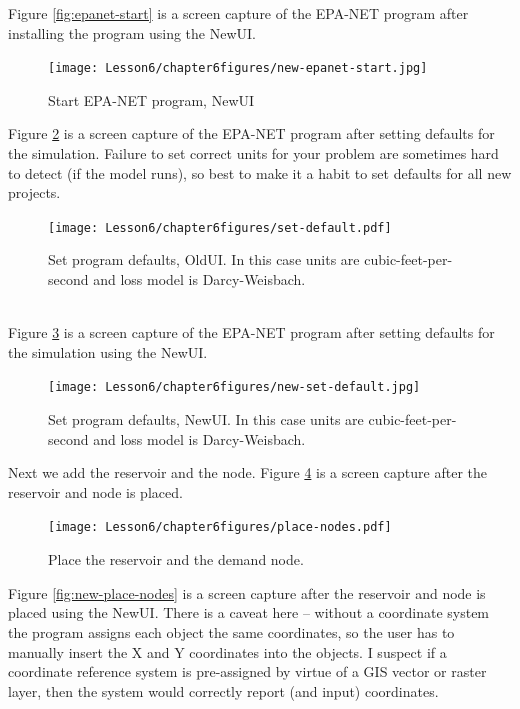 Figure \ref{fig:epanet-start} is a screen capture of the EPA-NET program after installing the program using the NewUI. 
\begin{figure}[htbp] %
   \centering
   \texttt{[image: Lesson6/chapter6figures/new-epanet-start.jpg]} 
   \caption{Start EPA-NET program, NewUI}
   \label{fig:new-epanet-start}
\end{figure}
\clearpage
Figure \ref{fig:set-default} is a screen capture of the EPA-NET program after setting defaults for the simulation.   Failure to set correct units for your problem are sometimes hard to detect (if the model runs), so best to make it a habit to set defaults for all new projects.
\begin{figure}[h!] %
   \centering
   \texttt{[image: Lesson6/chapter6figures/set-default.pdf]} 
   \caption{Set program defaults, OldUI.  In this case units are cubic-feet-per-second and loss model is Darcy-Weisbach.}
   \label{fig:set-default}
\end{figure}
\\Figure \ref{fig:new-set-default} is a screen capture of the EPA-NET program after setting defaults for the simulation using the NewUI.
\begin{figure}[h!] %
   \centering
   \texttt{[image: Lesson6/chapter6figures/new-set-default.jpg]} 
   \caption{Set program defaults, NewUI.  In this case units are cubic-feet-per-second and loss model is Darcy-Weisbach.}
   \label{fig:new-set-default}
\end{figure}
\clearpage

Next we add the reservoir and the node.   
Figure \ref{fig:place-nodes} is a screen capture after the reservoir and node is placed.
\begin{figure}[h!] %
   \centering
   \texttt{[image: Lesson6/chapter6figures/place-nodes.pdf]} 
   \caption{Place the reservoir and the demand node.}
   \label{fig:place-nodes}
\end{figure}
\newline Figure \ref{fig:new-place-nodes} is a screen capture after the reservoir and node is placed using the NewUI. 
There is a caveat here -- without a coordinate system the program assigns each object the same coordinates, so the user has to manually insert the X and Y coordinates into the objects.  I suspect if a coordinate reference system is pre-assigned by virtue of a GIS vector or raster layer, then the system would correctly report (and input) coordinates.

